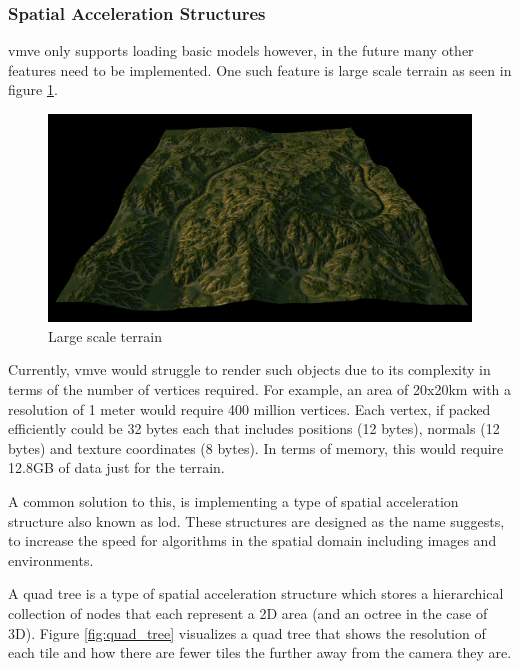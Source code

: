 \documentclass[11pt]{article}
\begin{document}
\subsubsection{Spatial Acceleration Structures}
\gls{vmve} only supports loading basic models however, in the future many other
features need to be implemented. One such feature is large scale terrain as seen
in figure \ref{fig:quad_tree_terrain}.

\begin{figure}[h!]
  \centering
  \includegraphics[width=\textwidth]{images/quad_tree_terrain.png}
  \caption{Large scale terrain}
  \label{fig:quad_tree_terrain}
\end{figure}

Currently, \gls{vmve} would struggle to render such objects due to its
complexity in terms of the number of vertices required. For example, an area of
20x20km with a resolution of 1 meter would require 400 million vertices. Each
vertex, if packed efficiently could be 32 bytes each that includes positions (12
bytes), normals (12 bytes) and texture coordinates (8 bytes). In terms of
memory, this would require 12.8GB of data just for the terrain.

A common solution to this, is implementing a type of spatial acceleration
structure also known as \gls{lod}. These structures are designed as the name
suggests, to increase the speed for algorithms in the spatial domain including
images and environments.

A quad tree is a type of spatial acceleration structure which stores a
hierarchical collection of nodes that each represent a 2D area (and an octree in
the case of 3D). Figure \ref{fig:quad_tree} visualizes a quad tree that shows
the resolution of each tile and how there are fewer tiles the further away from
the camera they are.
\end{document}
